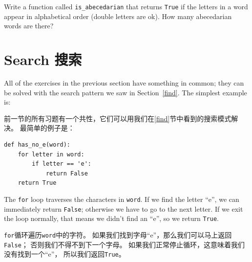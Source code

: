 \documentclass[10pt]{book}
\begin{document}
\begin{CJK}{UTF8}{gbsn}
\begin{exercise}
\end{exercise}


\begin{exercise}

Write a function called \verb"is_abecedarian" that returns
{\tt True} if the letters in a word appear in alphabetical order
(double letters are ok).  
How many abecedarian words are there?


\end{exercise}






\section{Search 搜索}

All of the exercises in the previous section have something
in common; they can be solved with the search pattern we saw
in Section~\ref{find}.  The simplest example is:

前一节的所有习题有一个共性，它们可以用我们在\ref{find}节中看到的搜索模式解决。
最简单的例子是：

\begin{verbatim}
def has_no_e(word):
    for letter in word:
        if letter == 'e':
            return False
    return True
\end{verbatim}
%
The {\tt for} loop traverses the characters in {\tt word}.  If we find
the letter ``e'', we can immediately return {\tt False}; otherwise we
have to go to the next letter.  If we exit the loop normally, that
means we didn't find an ``e'', so we return {\tt True}.

{\tt for}循环遍历{\tt word}中的字符。
如果我们找到字母``e''，那么我们可以马上返回{\tt False}；
否则我们不得不到下一个字母。
如果我们正常停止循环，这意味着我们没有找到一个``e''，
所以我们返回{\tt True}。 


\end{CJK}
\end{document}
